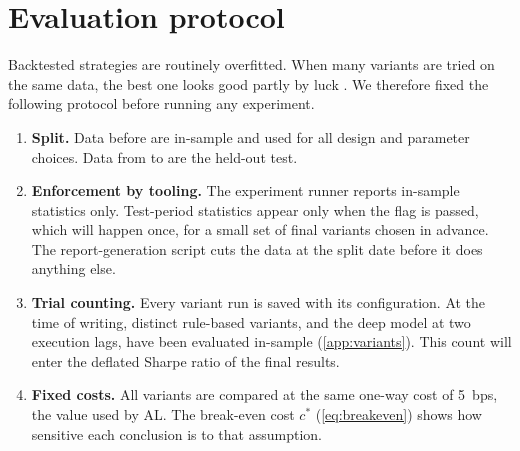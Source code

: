 \section{Evaluation protocol}
\label{sec:protocol}

Backtested strategies are routinely overfitted. When many variants are tried on the same data,
the best one looks good partly by luck \citep{harvey2016,bailey2014}. We therefore fixed the
following protocol before running any experiment.

\begin{enumerate}
  \item \textbf{Split.} Data before \SplitDate{} are in-sample and used for all design and
        parameter choices. Data from \SplitDate{} to \DataEnd{} are the held-out test.
  \item \textbf{Enforcement by tooling.} The experiment runner reports in-sample statistics only.
        Test-period statistics appear only when the flag  is passed, which will
        happen once, for a small set of final variants chosen in advance. The report-generation
        script cuts the data at the split date before it does anything else.
  \item \textbf{Trial counting.} Every variant run is saved with its configuration. At the time of
        writing, \NVariants{} distinct rule-based variants, and the deep model at two execution lags,
        have been evaluated in-sample
        (\cref{app:variants}). This count will enter the deflated Sharpe ratio of the final
        results.
  \item \textbf{Fixed costs.} All variants are compared at the same one-way cost of 5~bps, the
        value used by AL. The break-even cost $c^\ast$ (\cref{eq:breakeven}) shows how sensitive
        each conclusion is to that assumption.
\end{enumerate}

